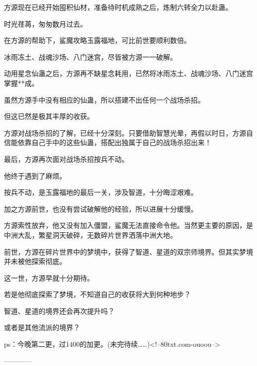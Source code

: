 \begin{this_body}
方源现在已经开始囤积仙材，准备待时机成熟之后，炼制六转全力以赴蛊。

时光荏苒，匆匆数月过去。

在方源的帮助下，鲨魔攻略玉露福地，可比前世要顺利数倍。

冰雨冻土、战魂沙场、八门迷宫，尽皆被方源一一破解。

动用星念仙蛊之后，方源再不缺星念耗用，已然将冰雨冻土、战魂沙场、八门迷宫掌握**成。

虽然方源手中没有相应的仙蛊，所以搭建不出任何一个战场杀招。

但这已然是极其丰厚的收获。

方源对战场杀招的了解，已经十分深刻。只要借助智慧光晕，再假以时日，方源自信能依靠自己手中的这些仙蛊，搭配出独属于自己的战场杀招出来！

最后，方源再次面对战场杀招按兵不动。

他终于遇到了麻烦。

按兵不动，是玉露福地的最后一关，涉及智道，十分晦涩艰难。

加之方源前世，也没有尝试破解他的经验，所以进展十分缓慢。

方源索性放弃，他又没有加入僵盟，鲨魔无法直接命令他。当然更主要的原因，是中洲大乱，繁星洞天破碎，无数碎片世界洒落中洲大地。

前世，方源在碎片世界中的梦境中，获得了智道、星道的双宗师境界。但其实梦境并未被他探索彻底。

这一世，方源早就十分期待。

若是他彻底探索了梦境，不知道自己的收获将大到何种地步？

智道、星道的境界还会再次提升吗？

或者是其他流派的境界？

ps：今晚第二更，过1400的加更。(未完待续……)<!--80txt.com-ouoou-->

------------

\end{this_body}

